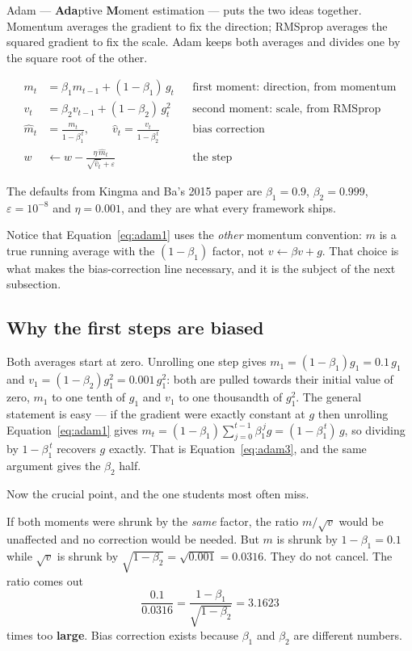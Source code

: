 \documentclass[11pt]{article}
\begin{document}
Adam --- \textbf{Ada}ptive \textbf{M}oment estimation --- puts the two ideas
together. Momentum averages the gradient to fix the direction; RMSprop averages
the squared gradient to fix the scale. Adam keeps both averages and divides one
by the square root of the other.

\begin{align}
  m_t &= \beta_1 m_{t-1} + (1-\beta_1)\, g_t
    &&\text{first moment: direction, from momentum} \label{eq:adam1}\\
  v_t &= \beta_2 v_{t-1} + (1-\beta_2)\, g_t^2
    &&\text{second moment: scale, from RMSprop} \label{eq:adam2}\\
  \hat m_t &= \frac{m_t}{1-\beta_1^{\,t}}, \qquad
  \hat v_t = \frac{v_t}{1-\beta_2^{\,t}}
    &&\text{bias correction} \label{eq:adam3}\\
  w &\leftarrow w - \frac{\eta\, \hat m_t}{\sqrt{\hat v_t} + \varepsilon}
    &&\text{the step} \label{eq:adam4}
\end{align}

The defaults from Kingma and Ba's 2015 paper are $\beta_1 = 0.9$,
$\beta_2 = 0.999$, $\varepsilon = 10^{-8}$ and $\eta = 0.001$, and they are what
every framework ships.

Notice that Equation~\eqref{eq:adam1} uses the \emph{other} momentum convention:
$m$ is a true running average with the $(1-\beta_1)$ factor, not
$v \leftarrow \beta v + g$. That choice is what makes the bias-correction line
necessary, and it is the subject of the next subsection.

\subsection{Why the first steps are biased}

Both averages start at zero. Unrolling one step gives
$m_1 = (1-\beta_1) g_1 = 0.1\,g_1$ and
$v_1 = (1-\beta_2) g_1^2 = 0.001\,g_1^2$: both are pulled towards their initial
value of zero, $m_1$ to one tenth of $g_1$ and $v_1$ to one thousandth of
$g_1^2$. The general statement is easy --- if the gradient were exactly
constant at $g$ then unrolling Equation~\eqref{eq:adam1} gives
$m_t = (1-\beta_1)\sum_{j=0}^{t-1}\beta_1^{\,j} g = (1-\beta_1^{\,t})\, g$, so
dividing by $1-\beta_1^{\,t}$ recovers $g$ exactly. That is
Equation~\eqref{eq:adam3}, and the same argument gives the $\beta_2$ half.

Now the crucial point, and the one students most often miss.

\begin{keyidea}
If both moments were shrunk by the \emph{same} factor, the ratio
$m/\sqrt{v}$ would be unaffected and no correction would be needed. But $m$ is
shrunk by $1-\beta_1 = 0.1$ while $\sqrt{v}$ is shrunk by
$\sqrt{1-\beta_2} = \sqrt{0.001} = 0.0316$. They do not cancel. The ratio comes
out
\[
  \frac{0.1}{0.0316} = \frac{1-\beta_1}{\sqrt{1-\beta_2}} = 3.1623
\]
times too \textbf{large}. Bias correction exists because $\beta_1$ and
$\beta_2$ are different numbers.
\end{keyidea}
\end{document}
